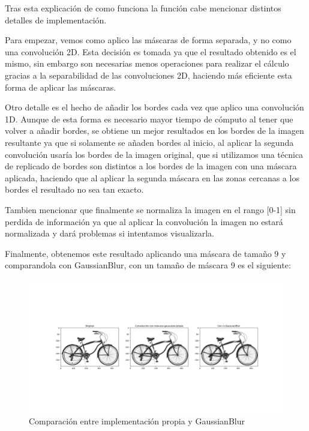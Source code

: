 \documentclass[12pt, spanish]{article}
\begin{document}
Tras esta explicación de como funciona la función cabe mencionar distintos detalles de implementación.

Para empezar, vemos como aplico las máscaras de forma separada, y no como una convolución 2D. Esta decisión es tomada ya que el resultado obtenido es el mismo, sin embargo son necesarias menos operaciones para realizar el cálculo gracias a la separabilidad de las convoluciones 2D, haciendo más eficiente esta forma de aplicar las máscaras\cite{separabilidad_2D}.

Otro detalle es el hecho de añadir los bordes cada vez que aplico una convolución 1D. Aunque de esta forma es necesario mayor tiempo de cómputo al tener que volver a añadir bordes, se obtiene un mejor resultados en los bordes de la imagen resultante ya que si solamente se añaden bordes al inicio, al aplicar la segunda convolución usaría los bordes de la imagen original, que si utilizamos una técnica de replicado de bordes son distintos a los bordes de la imagen con una máscara aplicada, haciendo que al aplicar la segunda máscara en las zonas cercanas a los bordes el resultado no sea tan exacto.

Tambien mencionar que finalmente se normaliza la imagen en el rango [0-1] sin perdida de información ya que al aplicar la convolución la imagen no estará normalizada y dará problemas si intentamos visualizarla.

Finalmente, obtenemos este resultado aplicando una máscara de tamaño 9 y comparandola con GaussianBlur, con un tamaño de máscara 9 es el siguiente:


\begin{figure}[H]
  \centering
      \includegraphics[width=\textwidth]{ejercicio1-b.png}
 		 \caption{Comparación entre implementación propia y GaussianBlur}
  		\label{fig:ej1b}

\end{figure}
\end{document}
